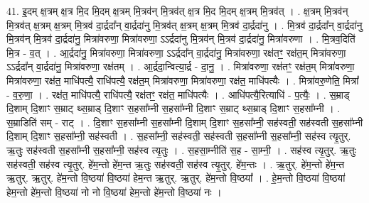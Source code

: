 \documentclass[17pt]{extarticle}
\begin{document}
41. इ॒दम् क्ष॒त्रम् क्ष॒त्र मि॒द मि॒दम् क्ष॒त्रम् मि॒त्रव॑न् मि॒त्रव॑त् क्ष॒त्र मि॒द मि॒दम् क्ष॒त्रम् मि॒त्रव॑त् । . क्ष॒त्रम् मि॒त्रव॑न् मि॒त्रव॑त् क्ष॒त्रम् क्ष॒त्रम् मि॒त्रव॑ दा॒र्द्रदा᳚न् वा॒र्द्रदा॑नु मि॒त्रव॑त् क्ष॒त्रम् क्ष॒त्रम् मि॒त्रव॑ दा॒र्द्रदा॑नु । . मि॒त्रव॑ दा॒र्द्रदा᳚न् वा॒र्द्रदा॑नु मि॒त्रव॑न् मि॒त्रव॑ दा॒र्द्रदा॑नु॒ मित्रा॑वरुणा॒ मित्रा॑वरुणा॒ ऽऽर्द्रदा॑नु मि॒त्रव॑न् मि॒त्रव॑ दा॒र्द्रदा॑नु॒ मित्रा॑वरुणा । . मि॒त्रव॒दिति॑ मि॒त्र - व॒त् । . आ॒र्द्रदा॑नु॒ मित्रा॑वरुणा॒ मित्रा॑वरुणा॒ ऽऽर्द्रदा᳚न् वा॒र्द्रदा॑नु॒ मित्रा॑वरुणा॒ रक्ष॑तꣳ॒॒ रक्ष॑त॒म् मित्रा॑वरुणा॒ ऽऽर्द्रदा᳚न् वा॒र्द्रदा॑नु॒ मित्रा॑वरुणा॒ रक्ष॑तम् । . आ॒र्द्रदा॒न्वित्या॒र्द्र - दा॒नु॒ । . मित्रा॑वरुणा॒ रक्ष॑तꣳ॒॒ रक्ष॑त॒म् मित्रा॑वरुणा॒ मित्रा॑वरुणा॒ रक्ष॑त॒ माधि॑पत्यै॒ राधि॑पत्यै॒ रक्ष॑त॒म् मित्रा॑वरुणा॒ मित्रा॑वरुणा॒ रक्ष॑त॒ माधि॑पत्यैः । . मित्रा॑वरु॒णेति॒ मित्रा᳚ - व॒रु॒णा॒ । . रक्ष॑त॒ माधि॑पत्यै॒ राधि॑पत्यै॒ रक्ष॑तꣳ॒॒ रक्ष॑त॒ माधि॑पत्यैः । . आधि॑पत्यै॒रित्याधि॑ - प॒त्यैः॒ । . स॒म्राड् दि॒शाम् दि॒शाꣳ स॒म्राट् थ्स॒म्राड् दि॒शाꣳ स॒हसा᳚म्नी स॒हसा᳚म्नी दि॒शाꣳ स॒म्राट् थ्स॒म्राड् दि॒शाꣳ स॒हसा᳚म्नी । . स॒म्राडिति॑ सम् - राट् । . दि॒शाꣳ स॒हसा᳚म्नी स॒हसा᳚म्नी दि॒शाम् दि॒शाꣳ स॒हसा᳚म्नी॒ सह॑स्वती॒ सह॑स्वती स॒हसा᳚म्नी दि॒शाम् 
दि॒शाꣳ स॒हसा᳚म्नी॒ सह॑स्वती । . स॒हसा᳚म्नी॒ सह॑स्वती॒ सह॑स्वती स॒हसा᳚म्नी स॒हसा᳚म्नी॒ सह॑स्व त्यृ॒तुर्. ऋ॒तुः सह॑स्वती स॒हसा᳚म्नी स॒हसा᳚म्नी॒ सह॑स्व त्यृ॒तुः । . स॒हसा॒म्नीति॑ स॒ह - सा॒म्नी॒ । . सह॑स्व त्यृ॒तुर्. ऋ॒तुः सह॑स्वती॒ सह॑स्व त्यृ॒तुर्. हे॑म॒न्तो हे॑म॒न्त ऋ॒तुः सह॑स्वती॒ सह॑स्व त्यृ॒तुर्. हे॑म॒न्तः । . ऋ॒तुर्. हे॑म॒न्तो हे॑म॒न्त ऋ॒तुर्. ऋ॒तुर्. हे॑म॒न्तो वि॒ष्ठया॑ वि॒ष्ठया॑ हेम॒न्त ऋ॒तुर्. ऋ॒तुर्. हे॑म॒न्तो वि॒ष्ठया᳚ । . हे॒म॒न्तो वि॒ष्ठया॑ वि॒ष्ठया॑ हेम॒न्तो हे॑म॒न्तो वि॒ष्ठया॑ नो नो वि॒ष्ठया॑ हेम॒न्तो हे॑म॒न्तो वि॒ष्ठया॑ नः । \newline
\end{document}
